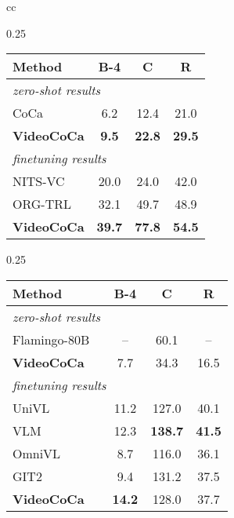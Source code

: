 \begin{table*}[t]
\begin{tabular}{cc}
 	
\begin{subtable}[t]{0.25\linewidth}
  		\setlength{\tabcolsep}{3pt} \centering
  		\caption{VATEX}
		\scriptsize{
			\begin{tabular}{l|ccc}
            \toprule 
  			Method & B-4 & C & R\\ 
            \midrule
\multicolumn{4}{l}{\textit{zero-shot results}}        \\
CoCa & 6.2 & 12.4 & 21.0  \\ 
\textbf{VideoCoCa} &  \textbf{9.5} & \textbf{22.8} & \textbf{29.5}  \\ \midrule
\multicolumn{4}{l}{\textit{finetuning results}}        \\
NITS-VC~\cite{singh2020nitsvc} & 20.0 & 24.0 & 42.0 \\
ORG-TRL~\cite{Zhang_2020_CVPR} & 32.1 & 49.7 & 48.9 \\
\textbf{VideoCoCa} & \textbf{39.7} & \textbf{77.8} & \textbf{54.5}  \\ 
 \bottomrule
\end{tabular} \label{tab:sota_vatex_captioning}
}
	\end{subtable}
  	     
  
  	\begin{subtable}[t]{0.25\linewidth}
\setlength{\tabcolsep}{2pt} \centering
  		\caption{Youcook2}
\scriptsize{
			\begin{tabular}{l|ccc}
\toprule 
  			Method & B-4 & C & R\\ 
 
 \midrule
\multicolumn{4}{l}{\textit{zero-shot results}}        \\
Flamingo-80B ~\cite{alayrac2022flamingo} & -- & 60.1 & --  \\ 
\textbf{VideoCoCa} &  7.7 & 34.3 & 16.5  \\ \midrule
\multicolumn{4}{l}{\textit{finetuning results}}        \\
UniVL~\cite{Luo2020UniVL} & 11.2 & 127.0 & 40.1 \\
VLM~\cite{xu2021vlm} & 12.3 & \textbf{138.7} & \textbf{41.5} \\
OmniVL~\cite{wang2022omnivl} & 8.7 & 116.0 & 36.1 \\
GIT2~\cite{wang2022git} & 9.4 & 131.2 & 37.5 \\
\textbf{VideoCoCa} & \textbf{14.2} & 128.0 & 37.7  \\ 
 \bottomrule
\end{tabular} \label{tab:sota_youcook2_captioning}
}
	\end{subtable}
	\end{tabular}

	\label{tab:sota_cap}
\end{table*}



